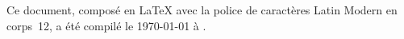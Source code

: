 \def\grabtimezone #1#2#3#4#5#6#7#8#9{\grabtimezoneB}
\def\grabtimezoneB #1#2#3#4#5#6#7{\grabtimezoneC}
\def\grabtimezoneC #1#2'#3'{UTC#1#2\string:#3}
\thispagestyle{empty}
Ce document, composé en \LaTeX{} avec la police de caractères Latin Modern en corps~12, a été compilé le \today{} à \thistime[\ h\ ]
\expandafter\grabtimezone\pdfcreationdate.